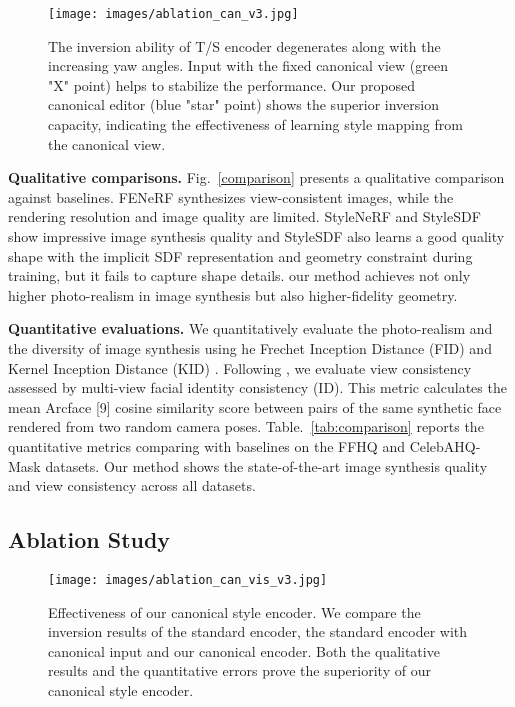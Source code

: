 \documentclass[acmtog]{acmart}
\begin{document}
\begin{figure}[b]
  \centering
  \texttt{[image: images/ablation\_can\_v3.jpg]}
  \caption{The inversion ability of T/S encoder degenerates along with the increasing yaw angles. Input with the fixed canonical view (green "X" point) helps to stabilize the performance. Our proposed canonical editor (blue "star" point) shows the superior inversion capacity, indicating the effectiveness of learning style mapping from the canonical view.}
  \Description{}
  \label{fig:chart}
\end{figure}

\noindent \textbf{Qualitative comparisons.} Fig.~\ref{comparison} presents a qualitative comparison against baselines. FENeRF synthesizes view-consistent images, while the rendering resolution and image quality are limited. StyleNeRF and StyleSDF show impressive image synthesis quality and StyleSDF also learns a good quality shape with the implicit SDF representation and geometry constraint during training, but it fails to capture shape details. our method achieves not only higher photo-realism in image synthesis but also higher-fidelity geometry.

\noindent \textbf{Quantitative evaluations.} We quantitatively evaluate the photo-realism and the diversity of image synthesis using he Frechet Inception Distance (FID) \cite{heusel2017gans} and Kernel Inception Distance (KID) \cite{binkowski2018demystifying}. Following \cite{eg3d}, we evaluate view consistency assessed by multi-view facial identity consistency (ID). This metric calculates the mean Arcface [9] cosine similarity score between pairs of the same synthetic face rendered from two random camera poses. Table.~\ref{tab:comparison} reports the quantitative metrics comparing with baselines on the FFHQ and CelebAHQ-Mask datasets. Our method shows the state-of-the-art image synthesis quality and view consistency across all datasets. 

\subsection{Ablation Study}
\label{sec:4.2}

\begin{figure}[t]
  \centering
  \texttt{[image: images/ablation\_can\_vis\_v3.jpg]}
  \caption{Effectiveness of our canonical style encoder. We compare the inversion results of the standard encoder, the standard encoder with canonical input and our canonical encoder. Both the qualitative results and the quantitative errors prove the superiority of our canonical style encoder.}
  \Description{}
  \label{fig:ablation_can}
\end{figure}
\end{document}
